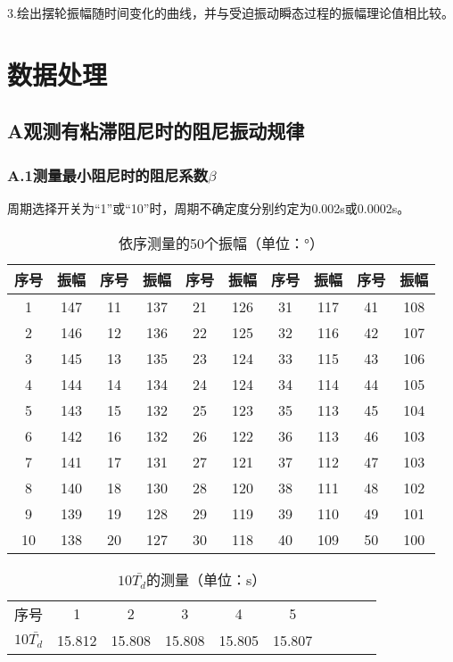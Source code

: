 \documentclass{ctexart}
\begin{document}
\noindent 3.绘出摆轮振幅随时间变化的曲线，并与受迫振动瞬态过程的振幅理论值相比较。




\section{数据处理}

\subsection*{A\quad 观测有粘滞阻尼时的阻尼振动规律}

\subsubsection*{A.1\quad 测量最小阻尼时的阻尼系数$\beta$}
\noindent 周期选择开关为“1”或“10”时，周期不确定度分别约定为0.002s或0.0002s。

\begin{table}[!htbp]
  \centering
  \caption{依序测量的50个振幅（单位：°）}\vspace{0.7em} \label{tab:aStrangeTable}%
  \begin{tabular}{cc|cc|cc|cc|cc}
  \toprule
  序号& 振幅& 序号& 振幅& 序号& 振幅& 序号& 振幅& 序号& 振幅 \\
  \midrule
  1& 147& 11& 137& 21& 126& 31& 117& 41& 108\\
  2& 146& 12& 136& 22& 125& 32& 116& 42& 107\\
  3& 145& 13& 135& 23& 124& 33& 115& 43& 106\\
  4& 144& 14& 134& 24& 124& 34& 114& 44& 105\\
  5& 143& 15& 132& 25& 123& 35& 113& 45& 104\\
  6& 142& 16& 132& 26& 122& 36& 113& 46& 103\\
  7& 141& 17& 131& 27& 121& 37& 112& 47& 103\\
  8& 140& 18& 130& 28& 120& 38& 111& 48& 102\\
  9& 139& 19& 128& 29& 119& 39& 110& 49& 101\\
  10& 138& 20& 127& 30& 118& 40& 109& 50& 100\\
  \bottomrule
  \end{tabular}
  \end{table}
    
\begin{table}[h]
  \caption{$10\bar{T_d}$的测量（单位：s）} \vspace{0.7em}
  \centering
  \begin{tabular}{cccccccccc}
    \hline
    序号& 1& 2& 3& 4& 5\\
    $10\bar{T_d}$& 15.812 & 15.808 & 15.808 & 15.805 & 15.807 \\
    \hline
    \end{tabular}
\end{table}
\end{document}
